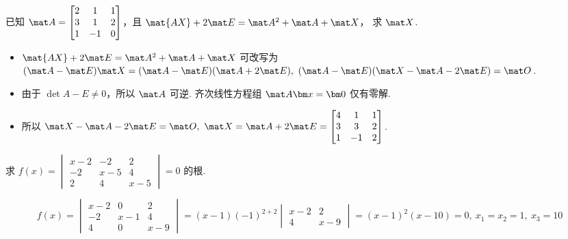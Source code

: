 \begin{problem}[本题7分]
  已知 $\mat A =
  \begin{bmatrix}
    2 & 1  & 1\\
    3 & 1  & 2\\
    1 & -1 & 0
  \end{bmatrix}$，且 $\mat{AX} + 2\mat E = \mat A^2 + \mat A + \mat X$，
  求 $\mat X$.
\end{problem}
\scratch[2ex]
\begin{solution}\leavevmode
  \begin{itemize}
    \item $\mat{AX} + 2\mat E = \mat A^2 + \mat A + \mat X$ 可改写为
    $ (\mat A - \mat E)\mat X = (\mat A - \mat E)(\mat A + 2\mat E),~
      (\mat A - \mat E)(\mat X - \mat A - 2\mat E) = \mat O$.
    \item 由于 $\det{A - E} \neq 0$，所以 $\mat A$ 可逆.
    齐次线性方程组 $\mat A\bm x = \bm 0$ 仅有零解.
    \item 所以 $\mat X - \mat A - 2\mat E = \mat O,~ \mat X = \mat A + 2\mat E =
    \begin{bmatrix}
      4 & 1 & 1\\
      3 & 3 & 2\\
      1 & -1 & 2
    \end{bmatrix}$.
  \end{itemize}
\end{solution}

\begin{problem}[本题7分]
  求 $f(x) =
  \begin{vmatrix}
    x - 2 & -2  & 2\\
    -2    & x-5 & 4\\
    2     & 4   & x-5
  \end{vmatrix} = 0$ 的根.
\end{problem}
\scratch[2ex]
\begin{solution}
  \[
      f(x) =
      \begin{vmatrix}
        x - 2 & 0     & 2\\
        -2    & x - 1 & 4\\
        4     & 0     & x - 9
      \end{vmatrix}
    = (x - 1)(-1)^{2+2}
      \begin{vmatrix}
        x - 2 & 2\\
        4     & x - 9
      \end{vmatrix}
    = (x - 1)^2(x - 10) = 0,~ x_1 = x_2 = 1,~ x_3 = 10
  \]
\end{solution}

